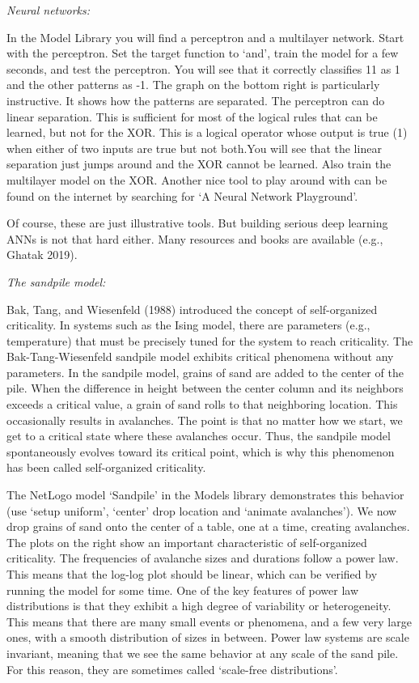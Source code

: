 \documentclass[
  letterpaper,
]{scrbook}
\begin{document}
\emph{Neural networks:}

In the Model Library you will find a perceptron and a multilayer
network. Start with the perceptron. Set the target function to `and',
train the model for a few seconds, and test the perceptron. You will see
that it correctly classifies 11 as 1 and the other patterns as -1. The
graph on the bottom right is particularly instructive. It shows how the
patterns are separated. The perceptron can do linear separation. This is
sufficient for most of the logical rules that can be learned, but not
for the XOR. This is a logical operator whose output is true (1) when
either of two inputs are true but not both.You will see that the linear
separation just jumps around and the XOR cannot be learned. Also train
the multilayer model on the XOR. Another nice tool to play around with
can be found on the internet by searching for `A Neural Network
Playground'.

Of course, these are just illustrative tools. But building serious deep
learning ANNs is not that hard either. Many resources and books are
available (e.g., Ghatak 2019).

\emph{The sandpile model:}

Bak, Tang, and Wiesenfeld (1988) introduced the concept of
self-organized criticality. In systems such as the Ising model, there
are parameters (e.g., temperature) that must be precisely tuned for the
system to reach criticality. The Bak-Tang-Wiesenfeld sandpile model
exhibits critical phenomena without any parameters. In the sandpile
model, grains of sand are added to the center of the pile. When the
difference in height between the center column and its neighbors exceeds
a critical value, a grain of sand rolls to that neighboring location.
This occasionally results in avalanches. The point is that no matter how
we start, we get to a critical state where these avalanches occur. Thus,
the sandpile model spontaneously evolves toward its critical point,
which is why this phenomenon has been called self-organized criticality.

The NetLogo model `Sandpile' in the Models library demonstrates this
behavior (use `setup uniform', `center' drop location and `animate
avalanches'). We now drop grains of sand onto the center of a table, one
at a time, creating avalanches. The plots on the right show an important
characteristic of self-organized criticality. The frequencies of
avalanche sizes and durations follow a power law. This means that the
log-log plot should be linear, which can be verified by running the
model for some time. One of the key features of power law distributions
is that they exhibit a high degree of variability or heterogeneity. This
means that there are many small events or phenomena, and a few very
large ones, with a smooth distribution of sizes in between. Power law
systems are scale invariant, meaning that we see the same behavior at
any scale of the sand pile. For this reason, they are sometimes called
`scale-free distributions'.
\end{document}
